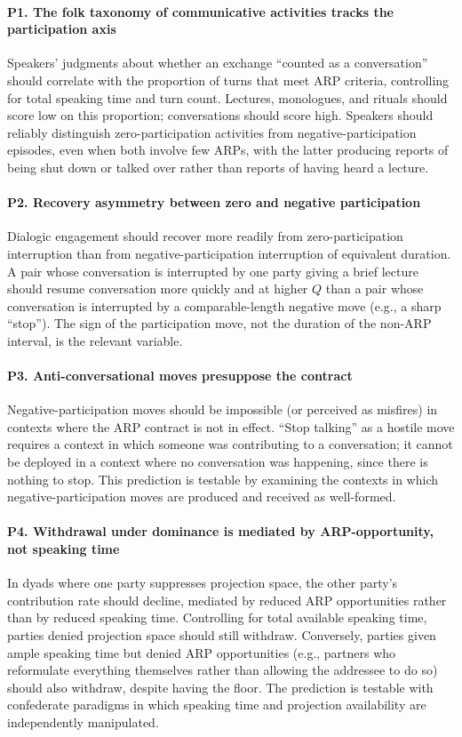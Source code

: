 \paragraph{P1. The folk taxonomy of communicative activities tracks the participation axis} Speakers' judgments about whether an exchange ``counted as a conversation'' should correlate with the proportion of turns that meet ARP criteria, controlling for total speaking time and turn count. Lectures, monologues, and rituals should score low on this proportion; conversations should score high. Speakers should reliably distinguish zero-participation activities from negative-participation episodes, even when both involve few ARPs, with the latter producing reports of being shut down or talked over rather than reports of having heard a lecture.

\paragraph{P2. Recovery asymmetry between zero and negative participation} Dialogic engagement should recover more readily from zero-participation interruption than from negative-participation interruption of equivalent duration. A pair whose conversation is interrupted by one party giving a brief lecture should resume conversation more quickly and at higher $Q$ than a pair whose conversation is interrupted by a comparable-length negative move (e.g., a sharp ``stop''). The sign of the participation move, not the duration of the non-ARP interval, is the relevant variable.

\paragraph{P3. Anti-conversational moves presuppose the contract} Negative-participation moves should be impossible (or perceived as misfires) in contexts where the ARP contract is not in effect. ``Stop talking'' as a hostile move requires a context in which someone was contributing to a conversation; it cannot be deployed in a context where no conversation was happening, since there is nothing to stop. This prediction is testable by examining the contexts in which negative-participation moves are produced and received as well-formed.

\paragraph{P4. Withdrawal under dominance is mediated by ARP-opportunity, not speaking time} In dyads where one party suppresses projection space, the other party's contribution rate should decline, mediated by reduced ARP opportunities rather than by reduced speaking time. Controlling for total available speaking time, parties denied projection space should still withdraw. Conversely, parties given ample speaking time but denied ARP opportunities (e.g., partners who reformulate everything themselves rather than allowing the addressee to do so) should also withdraw, despite having the floor. The prediction is testable with confederate paradigms in which speaking time and projection availability are independently manipulated.

